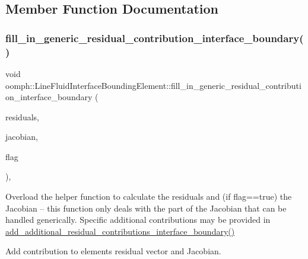 \subsection{Member Function Documentation}
\mbox{\label{classoomph_1_1LineFluidInterfaceBoundingElement_aa162a09ba8dfcba4d81e6abaa7a29986}} 
\subsubsection{\texorpdfstring{fill\+\_\+in\+\_\+generic\+\_\+residual\+\_\+contribution\+\_\+interface\+\_\+boundary()}{fill\_in\_generic\_residual\_contribution\_interface\_boundary()}}
{\footnotesize\ttfamily void oomph\+::\+Line\+Fluid\+Interface\+Bounding\+Element\+::fill\+\_\+in\+\_\+generic\+\_\+residual\+\_\+contribution\+\_\+interface\+\_\+boundary (\begin{DoxyParamCaption}\item[{Vector$<$ double $>$ \&}]{residuals,  }\item[{Dense\+Matrix$<$ double $>$ \&}]{jacobian,  }\item[{unsigned}]{flag }\end{DoxyParamCaption})\hspace{0.3cm}{\ttfamily [protected]}, {\ttfamily [virtual]}}



Overload the helper function to calculate the residuals and (if flag==true) the Jacobian -- this function only deals with the part of the Jacobian that can be handled generically. Specific additional contributions may be provided in \hyperlink{classoomph_1_1FluidInterfaceBoundingElement_a4510bd81b572d758694715f673080041}{add\+\_\+additional\+\_\+residual\+\_\+contributions\+\_\+interface\+\_\+boundary()} 

Add contribution to element\textquotesingle{}s residual vector and Jacobian. 

